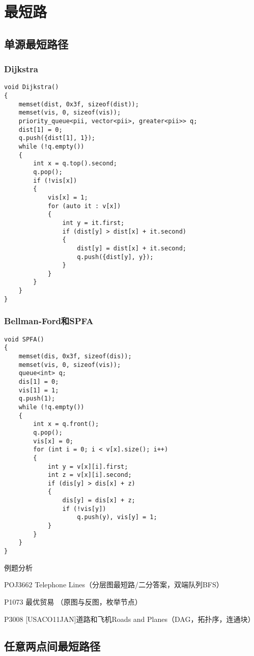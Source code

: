 \section{最短路}
\subsection{单源最短路径}
\subsubsection{Dijkstra}
\begin{lstlisting}
void Dijkstra()
{
    memset(dist, 0x3f, sizeof(dist));
    memset(vis, 0, sizeof(vis));
    priority_queue<pii, vector<pii>, greater<pii>> q;
    dist[1] = 0;
    q.push({dist[1], 1});
    while (!q.empty())
    {
        int x = q.top().second;
        q.pop();
        if (!vis[x])
        {
            vis[x] = 1;
            for (auto it : v[x])
            {
                int y = it.first;
                if (dist[y] > dist[x] + it.second)
                {
                    dist[y] = dist[x] + it.second;
                    q.push({dist[y], y});
                }
            }
        }
    }
}
\end{lstlisting}
\subsubsection{Bellman-Ford和SPFA}
\begin{lstlisting}
void SPFA()
{
    memset(dis, 0x3f, sizeof(dis));
    memset(vis, 0, sizeof(vis));
    queue<int> q;
    dis[1] = 0;
    vis[1] = 1;
    q.push(1);
    while (!q.empty())
    {
        int x = q.front();
        q.pop();
        vis[x] = 0;
        for (int i = 0; i < v[x].size(); i++)
        {
            int y = v[x][i].first;
            int z = v[x][i].second;
            if (dis[y] > dis[x] + z)
            {
                dis[y] = dis[x] + z;
                if (!vis[y])
                    q.push(y), vis[y] = 1;
            }
        }
    }
}
\end{lstlisting}
例题分析

POJ3662 Telephone Lines（分层图最短路/二分答案，双端队列BFS）

P1073 最优贸易 （原图与反图，枚举节点）

P3008 [USACO11JAN]道路和飞机Roads and Planes（DAG，拓扑序，连通块）

\subsection{任意两点间最短路径}
